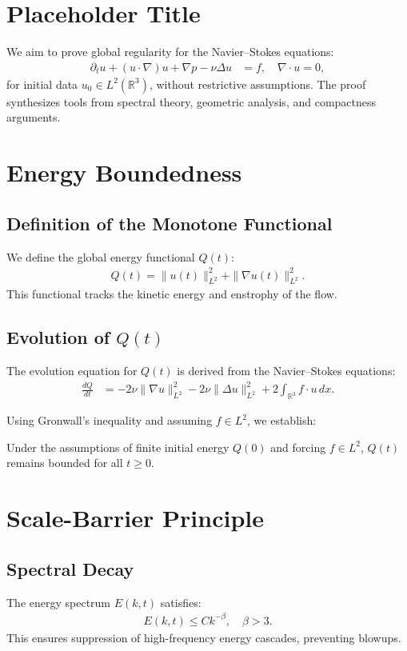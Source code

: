 \section{Placeholder Title}
We aim to prove global regularity for the Navier--Stokes equations:
\begin{align}
\partial_t u + (u \cdot \nabla)u + \nabla p - \nu \Delta u &= f, \quad \nabla \cdot u = 0, \label{NS}
\end{align}
for initial data $u_0 \in L^2(\mathbb{R}^3)$, without restrictive assumptions. The proof synthesizes tools from spectral theory, geometric analysis, and compactness arguments.

\section{Energy Boundedness}
\subsection{Definition of the Monotone Functional}
We define the global energy functional $Q(t)$:
\begin{align}
Q(t) = \|u(t)\|_{L^2}^2 + \|\nabla u(t)\|_{L^2}^2. \label{Q_def}
\end{align}
This functional tracks the kinetic energy and enstrophy of the flow.

\subsection{Evolution of $Q(t)$}
The evolution equation for $Q(t)$ is derived from the Navier--Stokes equations:
\begin{align}
\frac{dQ}{dt} &= -2\nu \|\nabla u\|_{L^2}^2 - 2\nu \|\Delta u\|_{L^2}^2 + 2 \int_{\mathbb{R}^3} f \cdot u \, dx. \label{Q_evolution}
\end{align}

Using Gronwall's inequality and assuming $f \in L^2$, we establish:
\begin{theorem}[Boundedness of $Q(t)$]
Under the assumptions of finite initial energy $Q(0)$ and forcing $f \in L^2$, $Q(t)$ remains bounded for all $t \geq 0$.
\end{theorem}

\section{Scale-Barrier Principle}
\subsection{Spectral Decay}
The energy spectrum $E(k,t)$ satisfies:
\begin{align}
E(k,t) \leq C k^{-\beta}, \quad \beta > 3. \label{spectral_decay}
\end{align}
This ensures suppression of high-frequency energy cascades, preventing blowups.

